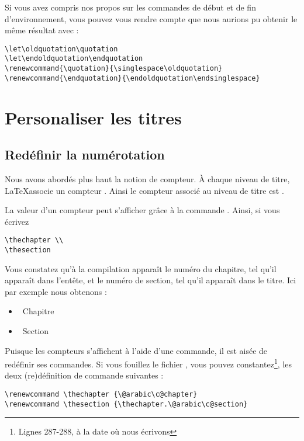 \begin{anedocte}
Si vous avez compris nos propos sur les commandes de début et de fin d'environnement, vous pouvez vous rendre compte que nous aurions pu obtenir le même résultat avec :
\begin{verbatim}
\let\oldquotation\quotation
\let\endoldquotation\endquotation
\renewcommand{\quotation}{\singlespace\oldquotation}
\renewcommand{\endquotation}{\endoldquotation\endsinglespace}
\end{verbatim}
\end{anedocte}

\section{Personaliser les titres}

\subsection{Redéfinir la numérotation}\label{apparencecompteur}
Nous avons abordés plus haut la notion de compteur. À chaque niveau de titre, \LaTeX associe un compteur . Ainsi le compteur associé au niveau de titre  est .

La valeur d'un compteur peut s'afficher grâce à la commande . Ainsi, si vous écrivez 
\begin{verbatim}
\thechapter \\
\thesection
\end{verbatim}

Vous constatez qu'à la compilation apparaît le numéro du chapitre, tel qu'il apparaît dans l'entête, et le numéro de section, tel qu'il apparaît dans le titre. Ici par exemple nous obtenons :


\begin{itemize}
\item\thechapter~Chapitre 
\item\thesection~Section
\end{itemize}


Puisque les compteurs s'affichent à l'aide d'une commande, il est aisée de redéfinir ses commandes. Si vous fouillez le fichier , vous pouvez constantez\footnote{Lignes 287-288, à la date où nous écrivons}, les deux (re)définition de commande suivantes :

\begin{verbatim}
\renewcommand \thechapter {\@arabic\c@chapter}
\renewcommand \thesection {\thechapter.\@arabic\c@section}
\end{verbatim}

